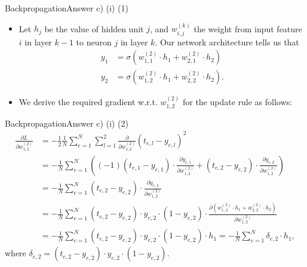 \documentclass[t]{beamer}
\begin{document}
\begin{frame}{Backpropagation}{Answer c) (i) (1)}
    \begin{itemize}
        \item Let $h_j$ be the value of hidden unit $j$, and
              $w_{i,j}^{(k)}$ the weight from input feature $i$ in layer
              $k-1$ to neuron $j$ in layer $k$.
              Our network architecture tells us that
              \begin{align*}
                  y_1 & = \sigma(w^{(2)}_{1,1}\cdot h_1 + w^{(2)}_{2,1}\cdot h_2)  \\
                  y_2 & = \sigma(w^{(2)}_{1,2}\cdot h_1 + w^{(2)}_{2,2}\cdot h_2).
              \end{align*}
        \item We derive the required gradient w.r.t. $w_{1,2}^{(2)}$ for
              the update rule as follows:
    \end{itemize}
\end{frame}

\begin{frame}{Backpropagation}{Answer c) (i) (2)}
    {\small
        \begin{align*}
            \frac{\partial L}{\partial w_{1,2}^{(2)}} & = - \frac{1}{2}\frac{1}{N}\sum_{e=1}^N \sum_{l=1}^2 \frac{\partial}{\partial w_{1,2}^{(2)}} \left(t_{e,l}-y_{e,l}\right)^2                                                                          \\
                                                      & = - \frac{1}{N} \sum_{e=1}^{N} \left( (-1)(t_{e,1}-y_{e,1})\cdot \frac{\partial y_{e,1}}{\partial w_{1,2}^{(2)}} + (t_{e,2}-y_{e,2}) \cdot \frac{\partial y_{e,2}}{\partial w_{1,2}^{(2)}}  \right) \\
                                                      & = - \frac{1}{N} \sum_{e=1}^{N} (t_{e,2}-y_{e,2})\cdot\frac{\partial y_{e,2}}{\partial w_{1,2}^{(2)}}                                                                                                \\
                                                      & = - \frac{1}{N} \sum_{e=1}^{N} (t_{e,2}-y_{e,2})\cdot y_{e,2}\cdot\left(1-y_{e,2}\right) \cdot \frac{\partial (w^{(2)}_{1,2}\cdot h_1 + w^{(2)}_{2,2}\cdot h_2)}{\partial w_{1,2}^{(2)}}            \\
                                                      & = - \frac{1}{N} \sum_{e=1}^{N} (t_{e,2}-y_{e,2})\cdot y_{e,2}\cdot\left(1-y_{e,2}\right) \cdot h_1
            = - \frac{1}{N} \sum_{e=1}^{N} \delta_{e,2} \cdot h_1,
        \end{align*}
        where $\delta_{e,2} = (t_{e,2}-y_{e,2})\cdot y_{e,2}\cdot\left(1-y_{e,2}\right).$
    }
\end{frame}
\end{document}
